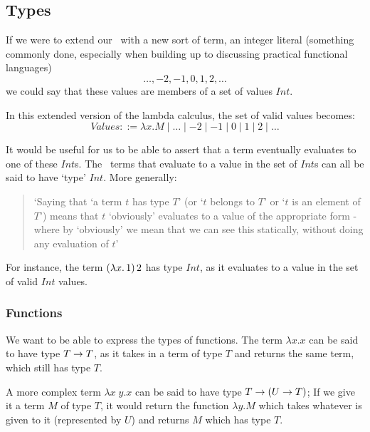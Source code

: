 \subsection{Types}
If we were to extend our \lcalc\ with a new sort of term, an integer literal (something commonly done, especially when building up to discussing practical functional languages) \[\dots, -2, -1, 0, 1, 2, \dots\] we could say that these values are members of a set of values $Int$. 

In this extended version of the lambda calculus, the set of valid values becomes:
\[Values ::= \lambda x. M \mid \dots \mid -2\mid -1\mid 0\mid 1\mid 2\mid \dots \]

\noindent It would be useful for us to be able to assert that a term eventually evaluates to one of these $Int$s. The \lcalc\ terms that evaluate to a value in the set of $Int$s can all be said to have `type' $Int$. More generally: 
\begin{quote}
`Saying that `a term $t$ has type $T$' (or `$t$ belongs to $T$' or `$t$ is an element of $T$') means that $t$ `obviously' evaluates to a value of the appropriate form - where by `obviously' we mean that we can see this statically, without doing any evaluation of $t$' \cite{pierce2002types}
\end{quote}

\noindent For instance, the term \((\lambda x.\, 1)\, 2\) has type $Int$, as it evaluates to a value in the set of valid $Int$ values. 


\subsubsection{Functions}
We want to be able to express the types of functions. The term \(\lambda x. x\) can be said to have type \(T \rightarrow T\), as it takes in a term of type $T$ and returns the same term, which still has type $T$.

A more complex term \(\lambda x\;y.x\) can be said to have type \(T \rightarrow (U \rightarrow T)\); If we give it a term $M$ of type $T$, it would return the function \(\lambda y.M\) which takes whatever is given to it (represented by $U$) and returns $M$ which has type $T$. 

